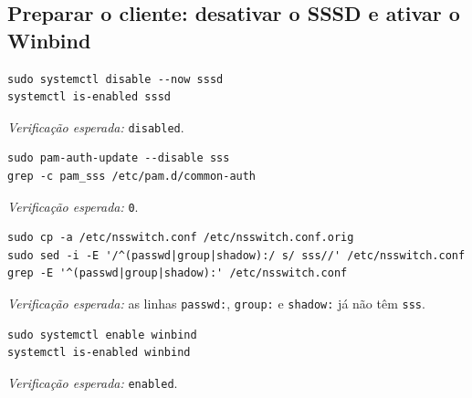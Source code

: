 
\subsection[Preparar o cliente: desativar o SSSD e ativar o Winbind]{Preparar o cliente: desativar o SSSD e ativar o Winbind}


\begin{lstlisting}[style=bashstyle]
sudo systemctl disable --now sssd
systemctl is-enabled sssd
\end{lstlisting}

\emph{Verificação esperada:} \texttt{disabled}.


\begin{lstlisting}[style=bashstyle]
sudo pam-auth-update --disable sss
grep -c pam_sss /etc/pam.d/common-auth
\end{lstlisting}

\emph{Verificação esperada:} \texttt{0}.


\begin{lstlisting}[style=bashstyle]
sudo cp -a /etc/nsswitch.conf /etc/nsswitch.conf.orig
sudo sed -i -E '/^(passwd|group|shadow):/ s/ sss//' /etc/nsswitch.conf
grep -E '^(passwd|group|shadow):' /etc/nsswitch.conf
\end{lstlisting}

\emph{Verificação esperada:} as linhas \texttt{passwd:}, \texttt{group:} e \texttt{shadow:} já não têm \texttt{sss}.


\begin{lstlisting}[style=bashstyle]
sudo systemctl enable winbind
systemctl is-enabled winbind
\end{lstlisting}

\emph{Verificação esperada:} \texttt{enabled}.

